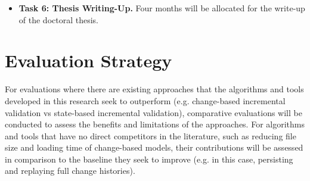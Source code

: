 \documentclass[12pt, a4paper]{report} \usepackage[titletoc]{appendix}
\begin{document}
\begin{itemize}
	\item \textbf{Task 6: Thesis Writing-Up.} Four months will be allocated for the write-up of the doctoral thesis.  
\end{itemize}

\chapter{Evaluation Strategy}
\label{ch:evaluation_strategy}
 For evaluations where there are existing approaches that the algorithms and tools developed in this research seek to outperform (e.g. change-based incremental validation vs state-based incremental validation), comparative evaluations will be conducted to assess the benefits and limitations of the approaches. For algorithms and tools that have no direct competitors in the literature, such as reducing file size and loading time of change-based models, their contributions will be assessed in comparison to the baseline they seek to improve (e.g. in this case, persisting and replaying full change histories).  
\end{document}
